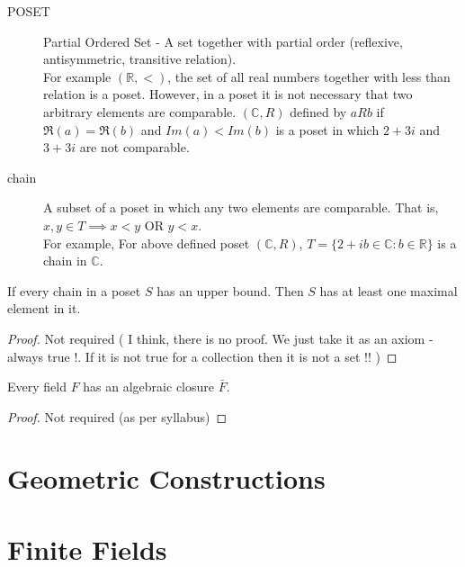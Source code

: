 \begin{description}
	\item[POSET] Partial Ordered Set - A set together with partial order (reflexive, antisymmetric, transitive relation).\\
		
	For example $(\mathbb{R},<)$, the set of all real numbers together with less than relation is a poset. However, in a poset it is not necessary that two arbitrary elements are comparable. $(\mathbb{C},R)$ defined by $aRb$ if $\Re(a) = \Re(b)$ and $Im(a) < Im(b)$ is a poset in which $2+3i$ and $3+3i$ are not comparable.
	\item[chain] A subset of a poset in which any two elements are comparable. That is, $x,y \in T \implies x < y \text{ OR } y < x$.\\

	For example, For above defined poset $(\mathbb{C},R)$, $T = \{ 2+ib \in \mathbb{C} : b \in \mathbb{R} \}$ is a chain in $\mathbb{C}$.
\end{description}
\begin{lemma}[Zorn]
	If every chain in a poset $S$ has an upper bound. Then $S$ has at least one maximal element in it.
\end{lemma}
\begin{proof}
	Not required ( I think, there is no proof. We just take it as an axiom - always true !. If it is not true for a collection then it is not a set !! )
\end{proof}
\begin{theorem}
	Every field $F$ has an algebraic closure $\bar{F}$.
\end{theorem}
\begin{proof}
	Not required (as per syllabus)
\end{proof}
\section{Geometric Constructions}

\section{Finite Fields}


